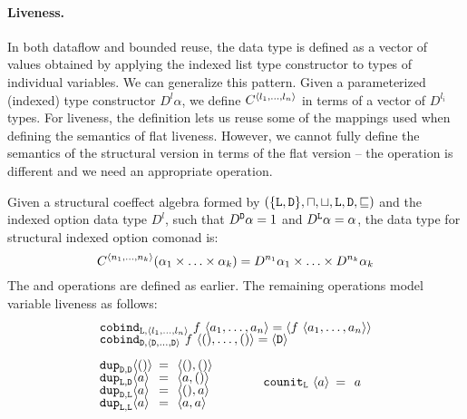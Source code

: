\paragraph{Liveness.}
In both dataflow and bounded reuse, the data type is defined as a vector of values obtained
by applying the indexed list type constructor to types of individual variables. We can
generalize this pattern. Given a parameterized (indexed) type constructor $D^l \alpha$, we define
$\ctyp{\langle l_1, \ldots, l_n \rangle}$ in terms of a vector of $D^{l_i}$ types.
For liveness, the definition lets us reuse some of the mappings used when defining the semantics of
flat liveness. However, we cannot fully define the semantics of the structural version in terms of
the flat version -- the  operation is different and we need an appropriate
 operation.

\begin{example}
\label{thm:struct-live}
Given a structural coeffect algebra formed by $(\{ \textnormal{\ttfamily L}, \textnormal{\ttfamily D} \}, \sqcap, \sqcup, \textnormal{\ttfamily L}, \textnormal{\ttfamily D}, \sqsubseteq)$
and the indexed option data type $D^l$, such that $D^{\textnormal{\ttfamily D}}\alpha = 1$ and $D^{\textnormal{\ttfamily L}}\alpha=\alpha$,
the data type for structural indexed option comonad is:
%
\begin{equation*}
C^{\langle n_1, \ldots, n_k\rangle}(\alpha_1 \times \ldots \times \alpha_k) =
  D^{n_1} \alpha_1 \times \ldots \times D^{n_k} \alpha_k
\end{equation*}
%
The  and  operations are defined as earlier. The remaining operations
model variable liveness as follows:
%
\begin{equation*}
\begin{array}{l}
\ident{cobind}_{\ident{L}, \langle l_1, \ldots, l_n \rangle}~f~\langle a_1, \ldots, a_n \rangle = \langle f~\langle a_1, \ldots, a_n \rangle \rangle \\[-0.25em]
\ident{cobind}_{\ident{D}, \langle \ident{D}, \ldots, \ident{D} \rangle}~f~\langle (), \ldots, () \rangle = \langle \ident{D} \rangle
\\[0.5em]
\hspace{-0.5em}
\begin{array}{lll}
~\\[-0.85em]
\ident{dup}_{\ident{D}, \ident{D}} \langle () \rangle &\narrow{=}& \langle (), () \rangle \\[-0.25em]
\ident{dup}_{\ident{L}, \ident{D}} \langle a \rangle &\narrow{=}& \langle a, () \rangle \\[-0.25em]
\ident{dup}_{\ident{D}, \ident{L}} \langle a \rangle &\narrow{=}& \langle (), a \rangle \\[-0.25em]
\ident{dup}_{\ident{L}, \ident{L}} \langle a \rangle &\narrow{=}& \langle a, a \rangle
\end{array}
\qquad\quad
\begin{array}{lll}
\ident{counit}_{\ident{L}}~\langle a \rangle &\narrow{=}& a
\end{array}
\end{array}
\end{equation*}
\end{example}

